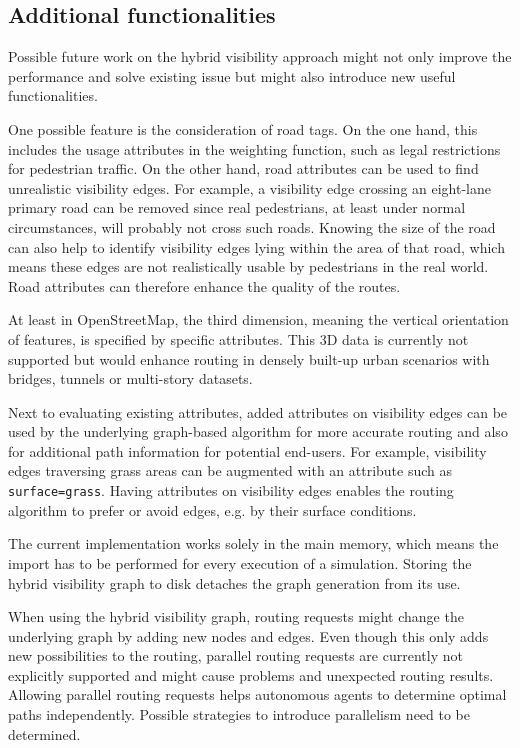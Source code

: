 	\subsection{Additional functionalities}
		
		Possible future work on the hybrid visibility approach might not only improve the performance and solve existing issue but might also introduce new useful functionalities.
		
		One possible feature is the consideration of road tags.
		On the one hand, this includes the usage attributes in the weighting function, such as legal restrictions for pedestrian traffic.
		On the other hand, road attributes can be used to find unrealistic visibility edges.
		For example, a visibility edge crossing an eight-lane primary road can be removed since real pedestrians, at least under normal circumstances, will probably not cross such roads.
		Knowing the size of the road can also help to identify visibility edges lying within the area of that road, which means these edges are not realistically usable by pedestrians in the real world.
		Road attributes can therefore enhance the quality of the routes.
		
		At least in OpenStreetMap, the third dimension, meaning the vertical orientation of features, is specified by specific attributes.
		This 3D data is currently not supported but would enhance routing in densely built-up urban scenarios with bridges, tunnels or multi-story datasets.
		
		Next to evaluating existing attributes, added attributes on visibility edges can be used by the underlying graph-based algorithm for more accurate routing and also for additional path information for potential end-users.
		For example, visibility edges traversing grass areas can be augmented with an attribute such as \texttt{surface=grass}.
		Having attributes on visibility edges enables the routing algorithm to prefer or avoid edges, e.g. by their surface conditions.
		
		The current implementation works solely in the main memory, which means the import has to be performed for every execution of a simulation.
		Storing the hybrid visibility graph to disk detaches the graph generation from its use.
		
		When using the hybrid visibility graph, routing requests might change the underlying graph by adding new nodes and edges.
		Even though this only adds new possibilities to the routing, parallel routing requests are currently not explicitly supported and might cause problems and unexpected routing results.
		Allowing parallel routing requests helps autonomous agents to determine optimal paths independently.
		Possible strategies to introduce parallelism need to be determined.
		
